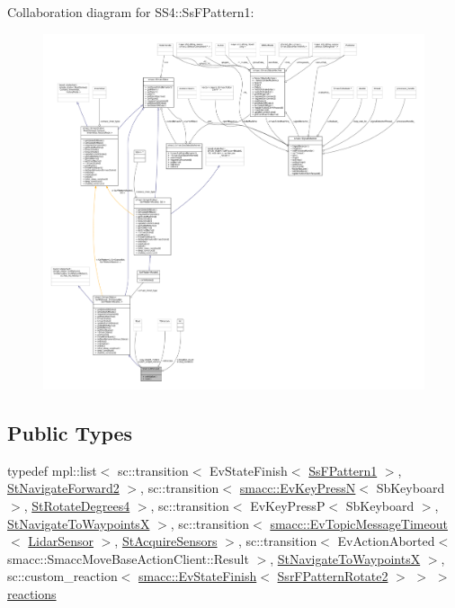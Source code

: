 Collaboration diagram for S\+S4\+:\+:Ss\+F\+Pattern1\+:
\nopagebreak
\begin{figure}[H]
\begin{center}
\leavevmode
\includegraphics[width=350pt]{structSS4_1_1SsFPattern1__coll__graph}
\end{center}
\end{figure}
\subsection*{Public Types}
\begin{DoxyCompactItemize}
\item 
typedef mpl\+::list$<$ sc\+::transition$<$ Ev\+State\+Finish$<$ \hyperlink{structSS4_1_1SsFPattern1}{Ss\+F\+Pattern1} $>$, \hyperlink{structStNavigateForward2}{St\+Navigate\+Forward2} $>$, sc\+::transition$<$ \hyperlink{structsmacc_1_1EvKeyPressN}{smacc\+::\+Ev\+Key\+PressN}$<$ Sb\+Keyboard $>$, \hyperlink{structStRotateDegrees4}{St\+Rotate\+Degrees4} $>$, sc\+::transition$<$ Ev\+Key\+PressP$<$ Sb\+Keyboard $>$, \hyperlink{structStNavigateToWaypointsX}{St\+Navigate\+To\+WaypointsX} $>$, sc\+::transition$<$ \hyperlink{structsmacc_1_1EvTopicMessageTimeout}{smacc\+::\+Ev\+Topic\+Message\+Timeout}$<$ \hyperlink{sensor__state_8h_a9db9e1944f88de79507758d08e4a2ee3}{Lidar\+Sensor} $>$, \hyperlink{structStAcquireSensors}{St\+Acquire\+Sensors} $>$, sc\+::transition$<$ Ev\+Action\+Aborted$<$ smacc\+::\+Smacc\+Move\+Base\+Action\+Client\+::\+Result $>$, \hyperlink{structStNavigateToWaypointsX}{St\+Navigate\+To\+WaypointsX} $>$, sc\+::custom\+\_\+reaction$<$ \hyperlink{structsmacc_1_1EvStateFinish}{smacc\+::\+Ev\+State\+Finish}$<$ \hyperlink{structSsrFPatternRotate2}{Ssr\+F\+Pattern\+Rotate2} $>$ $>$ $>$ \hyperlink{structSS4_1_1SsFPattern1_a7fc9c850f50926b0a4e0d00ecd178ed7}{reactions}
\end{DoxyCompactItemize}
